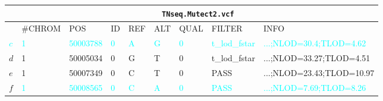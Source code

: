 \tiny
\setlength{\tabcolsep}{3pt}
\begin{tabular}{l|llllllll|}
\footnotesize &
\multicolumn{8}{c}{\footnotesize \texttt{TNseq.Mutect2.vcf}} \\
\hline
 & \#CHROM & POS & ID & REF & ALT & QUAL & FILTER & INFO \\
\textcolor{cyan}{\(c\)} &
\textcolor{cyan}{1} &
\textcolor{cyan}{50003788} &
\textcolor{cyan}{0} &
\textcolor{cyan}{A} &
\textcolor{cyan}{G} &
\textcolor{cyan}{0} &
\textcolor{cyan}{t\_lod\_fstar} &
\textcolor{cyan}{...;NLOD=30.4;TLOD=4.62} \\
\textcolor{cyan!50!brown}{\(d\)} &
\textcolor{cyan!50!brown}{1} &
\textcolor{cyan!50!brown}{50005034} &
\textcolor{cyan!50!brown}{0} &
\textcolor{cyan!50!brown}{G} &
\textcolor{cyan!50!brown}{T} &
\textcolor{cyan!50!brown}{0} &
\textcolor{cyan!50!brown}{t\_lod\_fstar} &
\textcolor{cyan!50!brown}{...;NLOD=33.27;TLOD=4.51} \\
\textcolor{cyan!50!brown}{\(e\)} &
\textcolor{cyan!50!brown}{1} &
\textcolor{cyan!50!brown}{50007349} &
\textcolor{cyan!50!brown}{0} &
\textcolor{cyan!50!brown}{C} &
\textcolor{cyan!50!brown}{T} &
\textcolor{cyan!50!brown}{0} &
\textcolor{cyan!50!brown}{PASS} &
\textcolor{cyan!50!brown}{...;NLOD=23.43;TLOD=10.97} \\
\textcolor{cyan!50!brown}{\(f\)} &
\textcolor{cyan}{1} &
\textcolor{cyan}{50008565} &
\textcolor{cyan}{0} &
\textcolor{cyan}{C} &
\textcolor{cyan}{A} &
\textcolor{cyan}{0} &
\textcolor{cyan}{PASS} &
\textcolor{cyan}{...;NLOD=7.69;TLOD=8.26} \\
\hline
\end{tabular}
\tiny
\\[1em]
